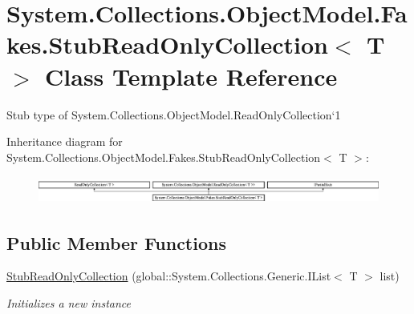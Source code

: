 \hypertarget{class_system_1_1_collections_1_1_object_model_1_1_fakes_1_1_stub_read_only_collection_3_01_t_01_4}{\section{System.\-Collections.\-Object\-Model.\-Fakes.\-Stub\-Read\-Only\-Collection$<$ T $>$ Class Template Reference}
\label{class_system_1_1_collections_1_1_object_model_1_1_fakes_1_1_stub_read_only_collection_3_01_t_01_4}
}


Stub type of System.\-Collections.\-Object\-Model.\-Read\-Only\-Collection`1 


Inheritance diagram for System.\-Collections.\-Object\-Model.\-Fakes.\-Stub\-Read\-Only\-Collection$<$ T $>$\-:\begin{figure}[H]
\begin{center}
\leavevmode
\includegraphics[height=0.906149cm]{class_system_1_1_collections_1_1_object_model_1_1_fakes_1_1_stub_read_only_collection_3_01_t_01_4}
\end{center}
\end{figure}
\subsection*{Public Member Functions}
\begin{DoxyCompactItemize}
\item 
\hyperlink{class_system_1_1_collections_1_1_object_model_1_1_fakes_1_1_stub_read_only_collection_3_01_t_01_4_a3de25ed1227cfbabe4d0d55459562acb}{Stub\-Read\-Only\-Collection} (global\-::\-System.\-Collections.\-Generic.\-I\-List$<$ T $>$ list)
\begin{DoxyCompactList}\small\item\em Initializes a new instance\end{DoxyCompactList}\end{DoxyCompactItemize}
